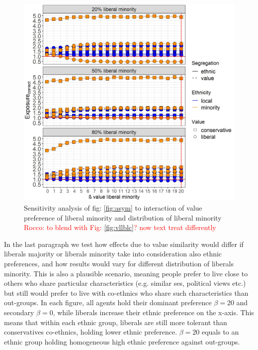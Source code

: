 \documentclass{article}
\newcommand{\rocco}[1]{{\textcolor{red}{Rocco: #1}}} %
\begin{document}
\begin{figure}[H]
    \centering
    \includegraphics[scale=0.5]{material/figures/vllbmn.jpg}
    \caption{Sensitivity analysis of fig: \ref{fig:asym} to interaction of value preference of liberal minority and distribution of liberal minority \rocco{to blend with Fig: \ref{fig:vllblc}? now text treat differently}}
    \label{fig:vllbmn}
\end{figure} %

In the last paragraph we test how effects due to value similarity would differ if liberals majority or liberals minority take into consideration also ethnic preferences, and how results would vary for different distribution of liberals minority. This is also a plausible scenario, meaning people prefer to live close to others who share particular characteristics (e.g. similar ses, political views  etc.) but still would prefer to live with co-ethnics who share such characteristics than out-groups. In each figure, all agents hold their dominant preference $\beta = 20$ and secondary $\beta = 0$, while liberals increase their ethnic preference on the x-axis. This means that within each ethnic group, liberals are still more tolerant than conservatives co-ethnics, holding lower ethnic preference. $\beta = 20$ equals to an ethnic group holding homogeneous high ethnic preference against out-groups.%
\end{document}
